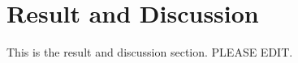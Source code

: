 \section{Result and Discussion}
\label{sec:resultsanddiscussion}

This is the result and discussion section. PLEASE EDIT.